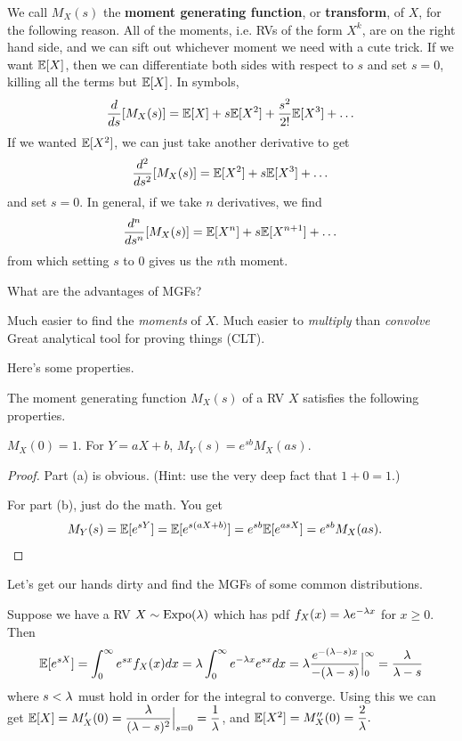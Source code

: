 \documentclass[11 pt]{scrartcl}
\begin{document}
We call $M_X(s)$ the \textbf{moment generating function}, or \textbf{transform}, of $X$, for the following reason. All of the moments, i.e. RVs of the form $X^k$, are on the right hand side, and we can sift out whichever moment we need with a cute trick. If we want $\mathbb E[X]$, then we can differentiate both sides with respect to $s$ and set $s = 0$, killing all the terms but $\mathbb E[X]$. In symbols, 
\[ \dfrac{d}{ds}[M_X(s)] = \mathbb E[X] + s\mathbb E[X^2] + \dfrac{s^2}{2!}\mathbb E[X^3] + \dots \] 
If we wanted $\mathbb E[X^2]$, we can just take another derivative to get 
\[ \dfrac{d^2}{ds^2}[M_X(s)] = \mathbb E[X^2] + s\mathbb E[X^3] + \dots\] 
and set $s = 0$. In general, if we take $n$ derivatives, we find 
\[ \dfrac{d^n}{ds^n}[M_X(s)] = \mathbb E[X^n] + s\mathbb E[X^{n+1}] + \dots \]
from which setting $s$ to $0$ gives us the $n$th moment. 

What are the advantages of MGFs? 
\begin{enumerate}
    \ii Much easier to find the \emph{moments} of $X$. 
    \ii Much easier to \emph{multiply} than \emph{convolve}
    \ii Great analytical tool for proving things (CLT).
\end{enumerate}

Here's some properties. 
\begin{theorem}
    The moment generating function $M_X(s)$ of a RV $X$ satisfies the following properties. 
    \begin{enumerate}[(1)]
        \ii $M_X(0) = 1$. 
        \ii For $Y = aX + b$, $M_Y(s) = e^{sb}M_X(as)$.
    \end{enumerate}
\end{theorem}
\begin{proof}
    Part (a) is obvious. (Hint: use the very deep fact that $1 + 0 = 1$.)

    For part (b), just do the math. You get 
    \begin{align*}
        M_Y(s) &= \mathbb E[e^{sY}] 
               = \mathbb E[e^{s(aX+b)}] 
               = e^{sb}\mathbb E[e^{asX}] = e^{sb} M_X(as).
    \end{align*}
\end{proof}

Let's get our hands dirty and find the MGFs of some common distributions. 
\begin{example}
    Suppose we have a RV $X\sim \text{Expo}(\lambda)$ which has pdf $f_X(x) = \lambda e^{-\lambda x}$ for $x\geq 0$. Then 
    \[ \mathbb E[e^{sX}] = \int_0^{\infty} e^{sx}f_X(x) dx = \lambda\int_0^{\infty} e^{-\lambda x} e^{sx} dx = \lambda \dfrac{e^{-(\lambda-s)x}}{-(\lambda-s)} \Big|^{\infty}_0 = \dfrac{\lambda}{\lambda-s}\] 
    where $s < \lambda$ must hold in order for the integral to converge. Using this we can get $\mathbb E[X] = M_X'(0) = \dfrac{\lambda}{(\lambda-s)^2}\Big|_{s=0} = \dfrac{1}{\lambda}$, and $\mathbb E[X^2] = M_X''(0) = \dfrac{2}{\lambda}.$ 
\end{example}
\end{document}
